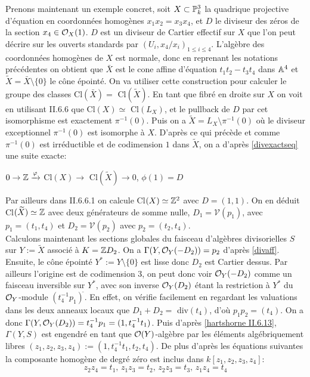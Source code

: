 Prenons maintenant un exemple concret, soit $X\subset \mathbb{P}^3_k$ la quadrique projective d'équation en coordonnées homogènes $x_1x_2=x_3x_4$, et $D$ le diviseur des zéros de la section $x_4\in\mathcal{O}_X(1)$. $D$ est un diviseur de Cartier effectif sur $X$ que l'on peut décrire sur les ouverts standards par $(U_i, x_4/x_i)_{1\leq i\leq 4}$. L'algèbre des coordonnées homogènes de $X$ est normale, donc en reprenant les notations précédentes on obtient que $\bar{X}$ est le cone affine d'équation $t_1t_2-t_3t_4$ dans $\mathbb{A}^4$ et $\widetilde{X}=\bar{X}\setminus\lbrace 0 \rbrace$ le cône épointé. On va utiliser cette construction pour calculer le groupe des classes Cl$(\bar{X})=$ Cl$(\widetilde{X})$. En tant que fibré en droite sur $X$ on voit en utilisant \cite{Hartshorne} II.6.6 que Cl$(X)\simeq$ Cl$(L_X)$, et le pullback de $D$ par cet isomorphisme est exactement $\pi^{-1}(0)$. Puis on a $\widetilde{X}=L_X \setminus \pi^{-1}(0)$ où le diviseur exceptionnel $\pi^{-1}(0)$ est isomorphe à $X$. D'après ce qui précède et comme $\pi^{-1}(0)$ est irréductible et de codimension $1$ dans $\widetilde{X}$, on a d'après \ref{divexactseq} une suite exacte:
\begin{center}
$ 0\rightarrow\mathbb{Z}\xrightarrow{\varphi}$ Cl$(X) \rightarrow$ Cl$(\widetilde{X}) \rightarrow 0$, $\phi(1)=D$
\end{center}
Par ailleurs dans \cite{Hartshorne} II.6.6.1 on calcule Cl$(X)\simeq \mathbb{Z}^2$ avec $D=(1,1)$. On en déduit Cl$(\widetilde{X})\simeq \mathbb{Z}$ avec deux générateurs de somme nulle, $D_1=\mathcal{V}(p_1)$, avec $p_1=(t_1,t_4)$ et $D_2=\mathcal{V}(p_2)$ avec $p_2=(t_2,t_4)$.\\ 
Calculons maintenant les sections globales du faisceau d'algèbres divisorielles $S$ sur $Y:=\widetilde{X}$ associé à $K=\mathbb{Z} D_2$. On a $\Gamma(Y, \mathcal{O}_Y(-D_2))=p_2$ d'après \ref{divaff}. Ensuite, le cône épointé $Y^*:=Y\setminus \lbrace 0 \rbrace$ est lisse donc $D_2$ est Cartier dessus. Par ailleurs l'origine est de codimension 3, on peut donc voir $\mathcal{O}_Y(-D_2)$ comme un faisceau inversible sur $Y^*$, avec son inverse $\mathcal{O}_Y(D_2)$ étant la restriction à $Y^*$ du $\mathcal{O}_Y$-module $(t_4^{-1}p_1)^{\widetilde{}}$. En effet, on vérifie facilement en regardant les valuations dans les deux anneaux locaux que $D_1+D_2=$ div$(t_4)$, d'où $p_1p_2=(t_4)$.  On a donc $\Gamma(Y, \mathcal{O}_Y(D_2))=t_4^{-1}p_1=(1, t_4^{-1}t_1)$. Puis d'après \ref{hartshorne II.6.13}, $\Gamma(Y,S)$ est engendré en tant que $\mathcal{O}(Y)$-algèbre par les éléments algébriquement libres $(z_1,z_2,z_3,z_4):=(1, t_4^{-1}t_1,t_2,t_4)$. De plus d'après les équations suivantes la composante homogène de degré zéro est inclus dans $k[z_1,z_2,z_3,z_4]$:
$$ z_2z_4=t_1,\, z_1z_3=t_2,\, z_2z_3=t_3,\, z_1z_4=t_4$$

